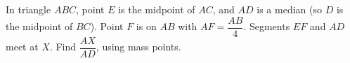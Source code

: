 In triangle $ABC$, point $E$ is the midpoint of $AC$, and $AD$ is a median (so $D$ is the midpoint of $BC$). Point $F$ is on $AB$ with $AF=\dfrac{AB}{4}$. Segments $EF$ and $AD$ meet at $X$. Find $\dfrac{AX}{AD}$, using mass points.
